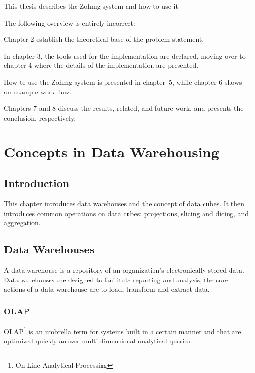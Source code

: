 This thesis describes the Zohmg system and how to use it.

The following overview is entirely incorrect:

Chapter 2 establish the theoretical base of the problem statement.

In chapter 3, the tools used for the implementation are declared, moving
over to chapter 4 where the details of the implementation are presented.

How to use the Zohmg system is presented in chapter~5, while chapter 6
shows an example work flow.

Chapters 7 and 8 discuss the results, related, and future work, and
presents the conclusion, respectively.



\chapter{Concepts in Data Warehousing}



\section*{Introduction}

This chapter introduces data warehouses and the concept of data cubes. It then
introduces common operations on data cubes: projections, slicing and dicing,
and aggregation.


\section{Data Warehouses}

A data warehouse is a repository of an organization's electronically stored
data. Data warehouses are designed to facilitate reporting and analysis; the
core actions of a data warehouse are to load, transform and extract data.


\subsection*{OLAP}

OLAP\footnote{On-Line Analytical Processing} is an umbrella term for systems
built in a certain manner and that are optimized quickly answer
multi-dimensional analytical queries.

